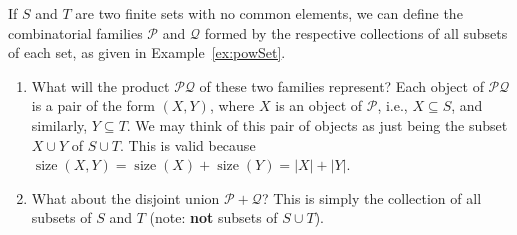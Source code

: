 \documentclass[11pt,a5paper]{amsart}
\newcommand{\cat}{\mathcal}
\DeclareMathOperator{\size}{size}
\begin{document}
\begin{Example}[label=ex:powSetOps]
If $S$ and $T$ are two finite sets with no common elements, we can define the combinatorial families $\cat P$ and $\cat Q$ formed by the respective collections of all subsets of each set, as given in Example~\ref{ex:powSet}.
\begin{enumerate}
\item What will the product $\cat P \cat Q$ of these two families represent? Each object of $\cat P \cat Q$ is a pair of the form $(X, Y)$, where $X$ is an object of $\cat P$, i.e., $X \subseteq S$, and similarly, $Y \subseteq T$. We may think of this pair of objects as just being the subset $X \cup Y$ of $S \cup T$. This is valid because $\size(X, Y) = \size(X) + \size(Y) = |X| + |Y|$.
\item What about the disjoint union $\cat P + \cat Q$? This is simply the collection of all subsets of $S$ and $T$ (note: \textbf{not} subsets of $S \cup T$).
\end{enumerate}
\end{Example}
\end{document}

